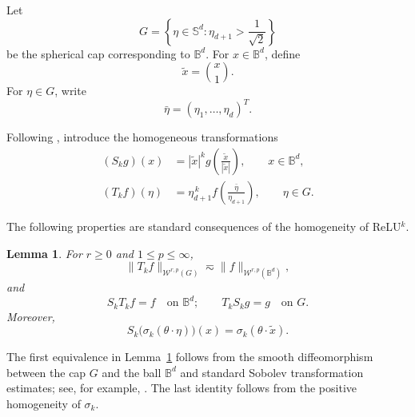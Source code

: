 \documentclass{article}
\numberwithin{equation}{section}
\newtheorem{lemma}{Lemma}
\def\BB{\mathbb{B}}
\begin{document}
Let
\[
G=\left\{\eta\in\mathbb S^d:
\eta_{d+1}>\frac1{\sqrt2}\right\}
\]
be the spherical cap corresponding to $\BB^d$.
For $x\in \BB^d$, define
\[
    \widetilde x=\binom{x}{1} .
\]
For $\eta\in G$, write
\[
    \bar\eta=(\eta_1,\ldots,\eta_d)^T .
\]

Following \cite{bach2017breaking,liu2025integral}, introduce the
homogeneous transformations
\begin{equation}\label{eq:SkTk}
\begin{aligned}
(S_k g)(x)
    &=|\widetilde x|^k
      g\left(\frac{\widetilde x}{|\widetilde x|}\right),
      \qquad x\in \BB^d,\\
(T_k f)(\eta)
    &=\eta_{d+1}^{\,k}
      f\left(\frac{\bar\eta}{\eta_{d+1}}\right),
      \qquad \eta\in G .
\end{aligned}
\end{equation}

The following properties are standard consequences of the homogeneity of
ReLU$^k$.

\begin{lemma}\label{lem:SkTk}
For $r\ge0$ and $1\le p\le\infty$,
\[
    \|T_k f\|_{\mathcal W^{r,p}(G)}
    \eqsim
    \|f\|_{\mathcal W^{r,p}(\BB^d)} ,
\]
and
\[
    S_kT_kf=f\quad\text{on }\BB^d;\qquad T_kS_kg=g\quad\text{on }G.
\]
Moreover,
\[
S_k\big(\sigma_k(\theta\cdot\eta)\big)(x)
=
\sigma_k(\theta\cdot\widetilde x).
\]
\end{lemma}

The first equivalence in Lemma~\ref{lem:SkTk} follows from the smooth diffeomorphism between the cap $G$ and the ball $\BB^d$ and standard Sobolev transformation estimates; see, for example, \cite{adams2003sobolev}. The last identity follows from the positive homogeneity of $\sigma_k$.
\end{document}
